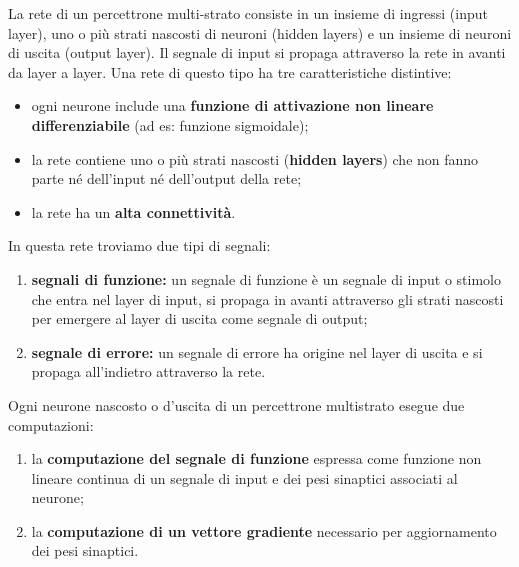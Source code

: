 La rete di un percettrone multi-strato consiste in un insieme di ingressi (input layer), uno o più strati nascosti di neuroni (hidden layers) e un insieme di neuroni di uscita (output layer). Il segnale di input si propaga attraverso la rete in avanti da layer a layer. Una rete di questo tipo ha tre caratteristiche distintive:
\begin{itemize}
    \item ogni neurone include una \textbf{funzione di attivazione non lineare differenziabile }(ad es: funzione
sigmoidale);
    \item la rete contiene uno o più strati nascosti (\textbf{hidden layers}) che non fanno parte né dell'input né dell'output della rete;
    \item la rete ha un \textbf{alta connettività}.
\end{itemize}
In questa rete troviamo due tipi di segnali:
\begin{enumerate}
    \item \textbf{segnali di funzione:} un segnale di funzione è un segnale di input o stimolo che entra nel layer di input, si propaga in avanti attraverso gli strati nascosti per emergere al layer di uscita come segnale di output;
    \item \textbf{segnale di errore:} un segnale di errore ha origine nel layer di uscita e si propaga all'indietro attraverso la rete.
\end{enumerate}

Ogni neurone nascosto o d'uscita di un percettrone multistrato esegue due computazioni:
\begin{enumerate}
    \item la \textbf{computazione del segnale di funzione} espressa come funzione non lineare continua
di un segnale di input e dei pesi sinaptici associati al neurone;
    \item la \textbf{computazione di un vettore gradiente} necessario per aggiornamento dei pesi
sinaptici.
\end{enumerate}


\newpage

